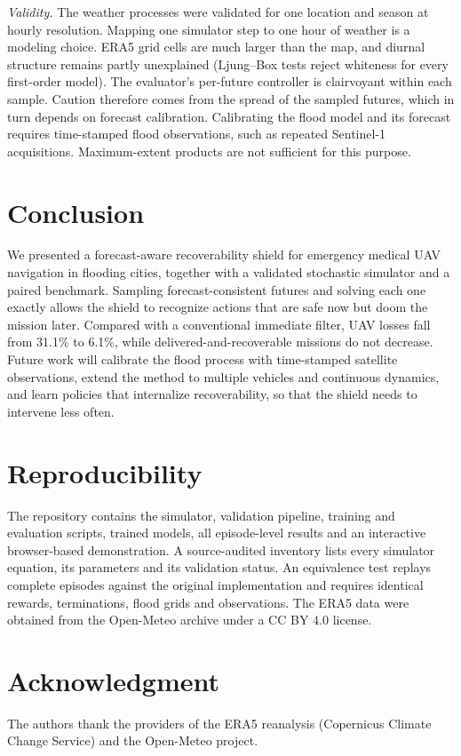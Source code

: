 \documentclass{ieeeaccess}
\begin{document}
\emph{Validity.} The weather processes were validated for one location and season at hourly resolution. Mapping one simulator step to one hour of weather is a modeling choice. ERA5 grid cells are much larger than the map, and diurnal structure remains partly unexplained (Ljung--Box tests reject whiteness for every first-order model). The evaluator's per-future controller is clairvoyant within each sample. Caution therefore comes from the spread of the sampled futures, which in turn depends on forecast calibration. Calibrating the flood model and its forecast requires time-stamped flood observations, such as repeated Sentinel-1 acquisitions. Maximum-extent products \cite{tellman2021} are not sufficient for this purpose.

\section{Conclusion}
\label{sec:conclusion}
We presented a forecast-aware recoverability shield for emergency medical UAV navigation in flooding cities, together with a validated stochastic simulator and a paired benchmark. Sampling forecast-consistent futures and solving each one exactly allows the shield to recognize actions that are safe now but doom the mission later. Compared with a conventional immediate filter, UAV losses fall from 31.1\% to 6.1\%, while delivered-and-recoverable missions do not decrease. Future work will calibrate the flood process with time-stamped satellite observations, extend the method to multiple vehicles and continuous dynamics, and learn policies that internalize recoverability, so that the shield needs to intervene less often.

\appendix
\section{Reproducibility}
The repository contains the simulator, validation pipeline, training and evaluation scripts, trained models, all episode-level results and an interactive browser-based demonstration. A source-audited inventory lists every simulator equation, its parameters and its validation status. An equivalence test replays complete episodes against the original implementation and requires identical rewards, terminations, flood grids and observations. The ERA5 data were obtained from the Open-Meteo archive under a CC BY 4.0 license.

\section*{Acknowledgment}
The authors thank the providers of the ERA5 reanalysis (Copernicus Climate Change Service) and the Open-Meteo project.
\end{document}
